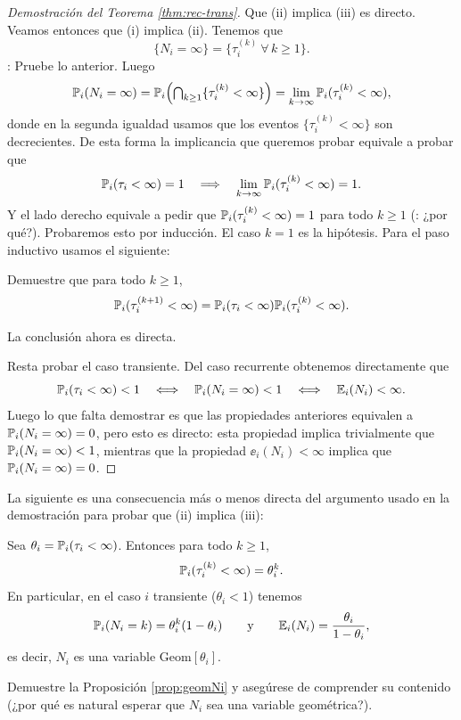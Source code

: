 \begin{proof}[Demostración del Teorema \ref{thm:rec-trans}]
Que (ii) implica (iii) es directo.
Veamos entonces que (i) implica (ii).
Tenemos que
\[\{N_i=\infty\}=\{\tau_i^{(k)}~\forall\,k\geq1\}.\]
\uexer: Pruebe lo anterior.
Luego
\[\mathbb{P}_i(N_i=\infty)=\mathbb{P}_i\Big({\textstyle\bigcap_{k\geq1}}\{\tau^{(k)}_i<\infty\}\Big)=\lim_{k\to\infty}\mathbb{P}_i(\tau^{(k)}_i<\infty),\]
donde en la segunda igualdad usamos que los eventos $\{\tau^{(k)}_i<\infty\}$ son decrecientes.
De esta forma la implicancia que queremos probar equivale a probar que 
\begin{equation}
\mathbb{P}_i(\tau_i<\infty)=1\quad\Longrightarrow\quad\lim_{k\to\infty}\mathbb{P}_i(\tau^{(k)}_i<\infty)=1.
\end{equation}
Y el lado derecho equivale a pedir que $\mathbb{P}_i(\tau^{(k)}_i<\infty)=1$ para todo $k\geq1$ (\uexers: ¿por qué?).
Probaremos esto por inducción.
El caso $k=1$ es la hipótesis.
Para el paso inductivo usamos el siguiente:
\begin{exer}
Demuestre que para todo $k\geq1$,
\[\mathbb{P}_i(\tau^{(k+1)}_i<\infty)=\mathbb{P}_i(\tau_i<\infty)\mathbb{P}_i(\tau^{(k)}_i<\infty).\]
\end{exer}
\noindent La conclusión ahora es directa.

Resta probar el caso transiente.
Del caso recurrente obtenemos directamente que
\[\mathbb{P}_i(\tau_i<\infty)<1\quad\Longleftrightarrow\quad\mathbb{P}_i(N_i=\infty)<1\quad\Longleftrightarrow\quad\mathbb{E}_i(N_i)<\infty.\]
Luego lo que falta demostrar es que las propiedades anteriores equivalen a $\mathbb{P}_i(N_i=\infty)=0$, pero esto es directo: esta propiedad implica trivialmente que $\mathbb{P}_i(N_i=\infty)<1$, mientras que la propiedad $\ee_i(N_i)<\infty$ implica que $\mathbb{P}_i(N_i=\infty)=0$.
\end{proof}

La siguiente es una consecuencia más o menos directa del argumento usado en la demostración para probar que (ii) implica (iii):

\begin{prop}\label{prop:geomNi}
Sea $\theta_i=\mathbb{P}_i(\tau_i<\infty)$.
Entonces para todo $k\geq1$,
\[\mathbb{P}_i(\tau^{(k)}_i<\infty)=\theta_i^k.\]
En particular, en el caso $i$ transiente ($\theta_i<1$) tenemos
\[\mathbb{P}_i(N_i=k)=\theta_i^k(1-\theta_i)\qquad\text{y}\qquad\mathbb{E}_i(N_i)=\frac{\theta_i}{1-\theta_i},\]
es decir, $N_i$ es una variable Geom$[\theta_i]$.
\end{prop}

\begin{exer}
Demuestre la Proposición \ref{prop:geomNi} y asegúrese de comprender su contenido (¿por qué es natural esperar que $N_i$ sea una variable geométrica?).
\end{exer}

